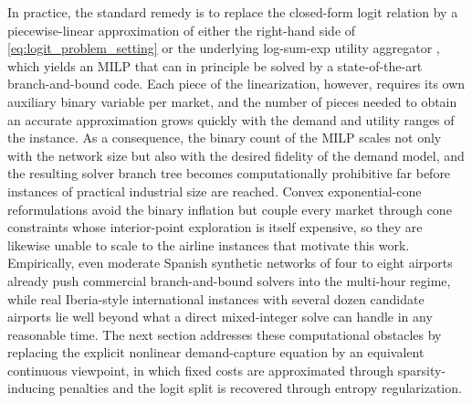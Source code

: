 In practice, the standard remedy is to replace the closed-form logit relation by a piecewise-linear approximation of either the right-hand side of \eqref{eq:logit_problem_setting} or the underlying log-sum-exp utility aggregator \cite{Vielma2015}, which yields an MILP that can in principle be solved by a state-of-the-art branch-and-bound code. Each piece of the linearization, however, requires its own auxiliary binary variable per market, and the number of pieces needed to obtain an accurate approximation grows quickly with the demand and utility ranges of the instance. As a consequence, the binary count of the MILP scales not only with the network size but also with the desired fidelity of the demand model, and the resulting solver branch tree becomes computationally prohibitive far before instances of practical industrial size are reached. Convex exponential-cone reformulations \cite{LubinYamangilBentVielma2018} avoid the binary inflation but couple every market through cone constraints whose interior-point exploration is itself expensive, so they are likewise unable to scale to the airline instances that motivate this work. Empirically, even moderate Spanish synthetic networks of four to eight airports already push commercial branch-and-bound solvers into the multi-hour regime, while real Iberia-style international instances with several dozen candidate airports lie well beyond what a direct mixed-integer solve can handle in any reasonable time. The next section addresses these computational obstacles by replacing the explicit nonlinear demand-capture equation by an equivalent continuous viewpoint, in which fixed costs are approximated through sparsity-inducing penalties and the logit split is recovered through entropy regularization.
